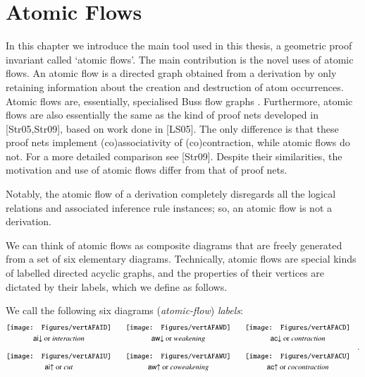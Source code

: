 
\chapter{Atomic Flows}



In this chapter we introduce the main tool used in this thesis, a geometric proof invariant called `atomic flows'. The main contribution is the novel uses of atomic flows. An atomic flow is a directed graph obtained from a derivation by only retaining information about the creation and destruction of atom occurrences. Atomic flows are, essentially, specialised Buss flow graphs \cite{Buss:91:The-Unde:uq,Carb:97:Interpol:fk}. Furthermore, atomic flows are also essentially the same as the kind of proof nets developed in [Str05,Str09], based on work done in [LS05]. The only difference is that these proof nets implement (co)associativity of (co)contraction, while atomic flows do not. For a more detailed comparison see [Str09]. Despite their similarities, the motivation and use of atomic flows differ from that of proof nets.

Notably, the atomic flow of a derivation completely disregards all the logical relations and associated inference rule instances; so, an atomic flow is not a derivation.


We can think of atomic flows as composite diagrams that are freely generated from a set of six elementary diagrams. Technically, atomic flows are special kinds of labelled directed acyclic graphs, and the properties of their vertices are dictated by their labels, which we define as follows.

\begin{definition}\label{definition:FlowLabels}
We call the following six diagrams (\emph{atomic-flow}) \emph{labels}:
\[
\begin{array}{@{}c@{}c@{}c@{}}
\vcenter{\hbox{\texttt{[image: Figures/vertAFAID]}}}&
\qquad
\vcenter{\hbox{\texttt{[image: Figures/vertAFAWD]}}}&
\qquad
\vcenter{\hbox{\texttt{[image: Figures/vertAFACD]}}}\\
\noalign{\smallskip}
      \mbox{$\aid$ or \emph{interaction}}&
\qquad\mbox{$\awd$ or \emph{weakening}}&
\qquad\mbox{$\acd$ or \emph{contraction}}\\
\noalign{\bigskip}
\vcenter{\hbox{\texttt{[image: Figures/vertAFAIU]}}}&
\qquad
\vcenter{\hbox{\texttt{[image: Figures/vertAFAWU]}}}&
\qquad
\vcenter{\hbox{\texttt{[image: Figures/vertAFACU]}}}\\
\noalign{\smallskip}
      \mbox{$\aiu$ or \emph{cut}}&
\qquad\mbox{$\awu$ or \emph{coweakening}}&
\qquad\mbox{$\acu$ or \emph{cocontraction}}\\
\end{array}\quad.
\]
\end{definition}


